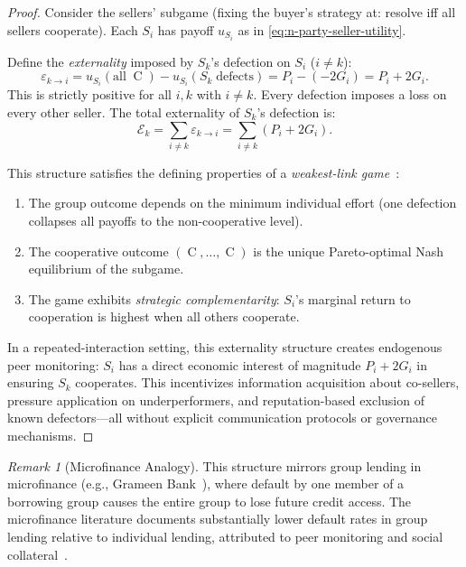 \documentclass[11pt,a4paper]{article}
\theoremstyle{definition}
\theoremstyle{remark}
\newtheorem{remark}[theorem]{Remark}
\newcommand{\pay}{P}           %
\newcommand{\cumval}{G}        %
\DeclareMathOperator{\Coop}{C}
\begin{document}
\begin{proof}
Consider the sellers' subgame (fixing the buyer's strategy at: resolve
iff all sellers cooperate). Each $S_i$ has payoff
$u_{S_i}$ as in \eqref{eq:n-party-seller-utility}.

Define the \emph{externality} imposed by $S_k$'s defection on $S_i$
($i \neq k$):
\begin{equation}
  \varepsilon_{k \to i}
    = u_{S_i}(\text{all}\;\Coop) - u_{S_i}(S_k\;\text{defects})
    = \pay_i - (-2\cumval_i)
    = \pay_i + 2\cumval_i.
\end{equation}
This is strictly positive for all $i, k$ with $i \neq k$. Every
defection imposes a loss on every other seller. The total externality
of $S_k$'s defection is:
\begin{equation}
  \mathcal{E}_k = \sum_{i \neq k} \varepsilon_{k \to i}
    = \sum_{i \neq k} (\pay_i + 2\cumval_i).
\end{equation}

This structure satisfies the defining properties of a \emph{weakest-link
game}~\citep{hirshleifer1983}:
\begin{enumerate}
  \item The group outcome depends on the minimum individual effort
    (one defection collapses all payoffs to the non-cooperative level).
  \item The cooperative outcome $(\Coop, \ldots, \Coop)$ is the unique
    Pareto-optimal Nash equilibrium of the subgame.
  \item The game exhibits \emph{strategic complementarity}: $S_i$'s
    marginal return to cooperation is highest when all others cooperate.
\end{enumerate}

In a repeated-interaction setting, this externality structure creates
endogenous peer monitoring: $S_i$ has a direct economic interest of
magnitude $\pay_i + 2\cumval_i$ in ensuring $S_k$ cooperates. This
incentivizes information acquisition about co-sellers, pressure
application on underperformers, and reputation-based exclusion of known
defectors---all without explicit communication protocols or governance
mechanisms.
\end{proof}

\begin{remark}[Microfinance Analogy]
This structure mirrors group lending in microfinance
(e.g., Grameen Bank~\citep{grameen1999}), where default by one member of
a borrowing group causes the entire group to lose future credit access.
The microfinance literature documents substantially lower default rates
in group lending relative to individual lending, attributed to peer
monitoring and social collateral~\citep{ghatak1999}.
\end{remark}
\end{document}
